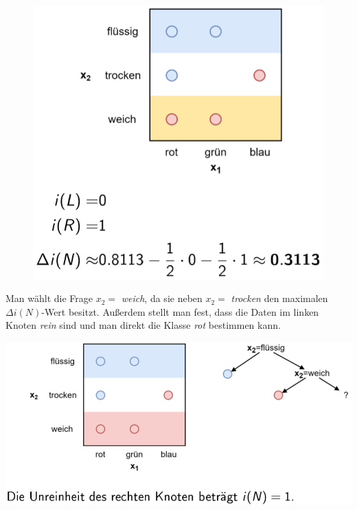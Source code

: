 \documentclass{report}
\begin{document}
  \begin{figure}[H]	
    \centering	
    \begin{minipage}[b]{0.4\textwidth}	
      \includegraphics[scale=.235]{ml07_19}	
    \end{minipage}	
  \end{figure}	
  
  Man wählt die Frage $x_2 = $ \textit{weich}, da sie neben $x_2 = $ \textit{trocken} den maximalen $\Delta i(N)$-Wert	
  besitzt. Außerdem stellt man fest, dass die Daten im linken Knoten \textit{rein} sind und man direkt die Klasse	
  \textit{rot} bestimmen kann.	
  
  \begin{center}	
    \includegraphics[scale=.3]{ml07_20}	
  \end{center}	
  
\end{document}
